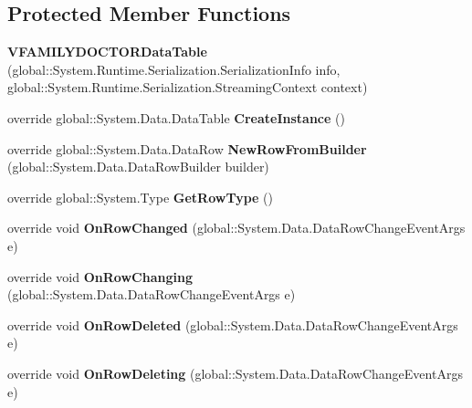 \subsection*{Protected Member Functions}
\begin{CompactItemize}
\item 
\textbf{VFAMILYDOCTORDataTable} (global::System.Runtime.Serialization.SerializationInfo info, global::System.Runtime.Serialization.StreamingContext context)\label{class_automatic_medical_system_1_1_data_set1_1_1_v_f_a_m_i_l_y_d_o_c_t_o_r_data_table_f09c7c47e01fcb42c80ea204d28946d7}

\item 
override global::System.Data.DataTable \textbf{CreateInstance} ()\label{class_automatic_medical_system_1_1_data_set1_1_1_v_f_a_m_i_l_y_d_o_c_t_o_r_data_table_2f777b19d699cee98aaa187e47645708}

\item 
override global::System.Data.DataRow \textbf{NewRowFromBuilder} (global::System.Data.DataRowBuilder builder)\label{class_automatic_medical_system_1_1_data_set1_1_1_v_f_a_m_i_l_y_d_o_c_t_o_r_data_table_330bf515b0671d6cf7e4aaa8767dabce}

\item 
override global::System.Type \textbf{GetRowType} ()\label{class_automatic_medical_system_1_1_data_set1_1_1_v_f_a_m_i_l_y_d_o_c_t_o_r_data_table_8aa3e8cd26b6eb98574e601c300e3de0}

\item 
override void \textbf{OnRowChanged} (global::System.Data.DataRowChangeEventArgs e)\label{class_automatic_medical_system_1_1_data_set1_1_1_v_f_a_m_i_l_y_d_o_c_t_o_r_data_table_8799dfd330b46ea54cb346c276a8dbe0}

\item 
override void \textbf{OnRowChanging} (global::System.Data.DataRowChangeEventArgs e)\label{class_automatic_medical_system_1_1_data_set1_1_1_v_f_a_m_i_l_y_d_o_c_t_o_r_data_table_af72205e64341b24ac308203b9a013b3}

\item 
override void \textbf{OnRowDeleted} (global::System.Data.DataRowChangeEventArgs e)\label{class_automatic_medical_system_1_1_data_set1_1_1_v_f_a_m_i_l_y_d_o_c_t_o_r_data_table_c2278832f91e1ad2246c36d0b4d582d1}

\item 
override void \textbf{OnRowDeleting} (global::System.Data.DataRowChangeEventArgs e)\label{class_automatic_medical_system_1_1_data_set1_1_1_v_f_a_m_i_l_y_d_o_c_t_o_r_data_table_4173b72abfe89fce643c10aad544d7e5}

\end{CompactItemize}
